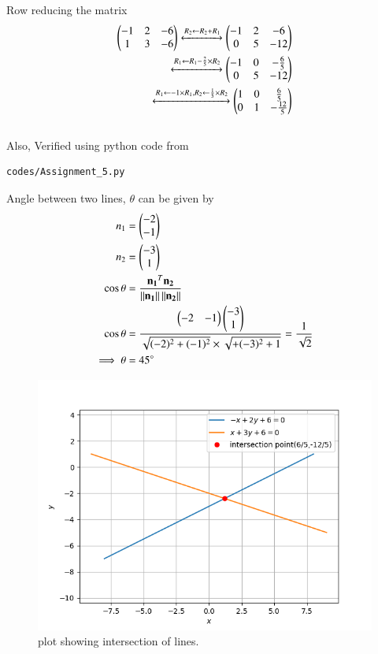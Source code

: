 \documentclass[journal,12pt,twocolumn]{IEEEtran}
\begin{document}
Row reducing the matrix
\begin{align}
 \begin{pmatrix}-1&2&-6\\1&3&-6\end{pmatrix}\xleftrightarrow[]{R_2\leftarrow R_2+R_1}\begin{pmatrix}-1&2&-6\\0&5&-12\end{pmatrix}\\
 \xleftrightarrow[]{R_1\leftarrow R_1-\frac{2}{5}\times R_2}\begin{pmatrix}-1&0&-\frac{6}{5}\\0&5&-12\end{pmatrix}\\
 \xleftrightarrow[]{R_1\leftarrow -1\times R_1  , R_2\leftarrow \frac{1}{5}\times R_2}\begin{pmatrix}1&0&\frac{6}{5}\\0&1&-\frac{12}{5}\end{pmatrix}
\end{align}
\\
Also, Verified using python code from
\begin{lstlisting}
codes/Assignment_5.py
\end{lstlisting}
Angle between two lines, $\theta$ can be given by
\begin{align}
n_1&=\begin{pmatrix}-2\\-1\end{pmatrix}\\
n_2&=\begin{pmatrix}-3\\1\end{pmatrix}\\
\cos \theta &= \frac{\mathbf{n_1}^T\mathbf{n_2}}{\left\lVert\mathbf{n_1}\right\rVert\left\lVert\mathbf{n_2}\right\rVert}\\
\cos \theta&=\frac{\begin{pmatrix}-2&-1\end{pmatrix}\begin{pmatrix}-3\\1\end{pmatrix}}{\sqrt{(-2)^2 +(-1)^2} \times \sqrt{+(-3)^2+1}}=\frac{1}{\sqrt{2}}\\
\implies \theta &= 45\degree
\end{align}
\begin{figure}[!h]
\centering
\includegraphics[width=\columnwidth]{Figure_1.png}
\caption{plot showing intersection of lines.}
\label{Fig_1}
\end{figure}
\end{document}
